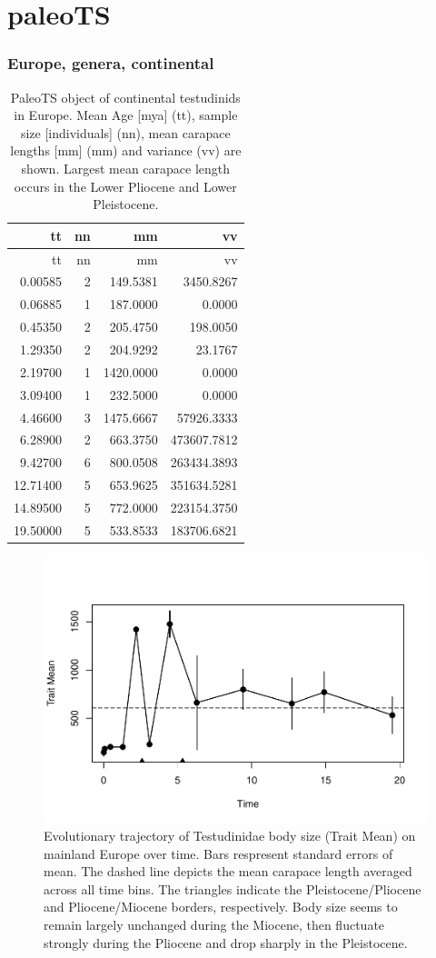 \section{paleoTS}

\subsubsection*{Europe, genera, continental}\label{europe-genera-continental}

\begin{longtable}[]{@{}rrrr@{}}
	\caption[PaleoTS object of continental \T in Europe]{PaleoTS object of continental testudinids in Europe. Mean Age [mya] (tt), sample size [individuals] (nn), mean carapace lengths [mm] (mm) and variance (vv) are shown. Largest mean carapace length occurs in the Lower Pliocene and Lower Pleistocene.}
	\label{tab:pTSEuC}\tabularnewline
	\toprule
	tt & nn & mm & vv\tabularnewline
	\midrule
	\endfirsthead
	\toprule
	tt & nn & mm & vv\tabularnewline
	\midrule
	\endhead
	0.00585 & 2 & 149.5381 & 3450.8267\tabularnewline
	0.06885 & 1 & 187.0000 & 0.0000\tabularnewline
	0.45350 & 2 & 205.4750 & 198.0050\tabularnewline
	1.29350 & 2 & 204.9292 & 23.1767\tabularnewline
	2.19700 & 1 & 1420.0000 & 0.0000\tabularnewline
	3.09400 & 1 & 232.5000 & 0.0000\tabularnewline
	4.46600 & 3 & 1475.6667 & 57926.3333\tabularnewline
	6.28900 & 2 & 663.3750 & 473607.7812\tabularnewline
	9.42700 & 6 & 800.0508 & 263434.3893\tabularnewline
	12.71400 & 5 & 653.9625 & 351634.5281\tabularnewline
	14.89500 & 5 & 772.0000 & 223154.3750\tabularnewline
	19.50000 & 5 & 533.8533 & 183706.6821\tabularnewline
	\bottomrule
\end{longtable}

\begin{figure}[H]
	\centering
	\includegraphics{MA_JJ_files/figure-latex/pTSEuC-1.pdf}
	\caption[PaleoTS plot of continental \T in Europe]{Evolutionary trajectory of Testudinidae body size (Trait Mean) on mainland Europe over time. Bars respresent standard errors of mean. The dashed line depicts the mean carapace length averaged across all time bins. The triangles indicate the Pleistocene/Pliocene and Pliocene/Miocene borders, respectively. Body size seems to remain largely unchanged during the Miocene, then fluctuate strongly during the Pliocene and drop sharply in the Pleistocene.}
	\label{fig:pTSEuC}
\end{figure}

